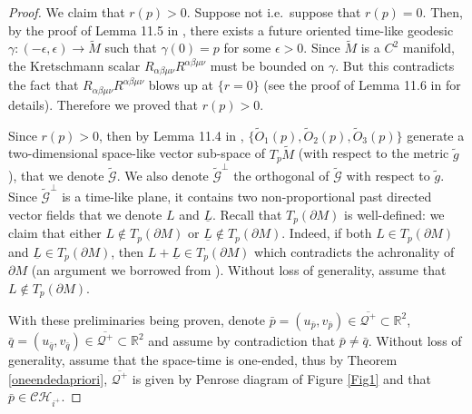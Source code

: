 \documentclass[10pt,a4paper]{article}
\newcommand{\barL}{\underline{L}}
\theoremstyle{plain}
\theoremstyle{remark}
\newcommand{\Oo}{\tilde{O}_1}
\newcommand{\Ot}{\tilde{O}_2}
\newcommand{\Oth}{\tilde{O}_3}
\theoremstyle{definition}
\newcommand{\RR}{\mathbb{R}}
\theoremstyle{plain}
\theoremstyle{remark}
\theoremstyle{definition}
\newcommand{\CH}{\mathcal{CH}_{i^+}}
\numberwithin{equation}{section}
\begin{document}
\begin{proof}
  We claim that $r(p)>0$. Suppose not i.e.\ suppose that $r(p)=0$. Then, by the proof of Lemma 11.5 in \cite{JonathanStab}, there exists a future oriented time-like geodesic $\gamma:(-\epsilon,\epsilon) \rightarrow \tilde{M}$ such that $\gamma(0)=p$ for some $\epsilon>0$. Since $\tilde{M}$ is a $C^2$ manifold, the Kretschmann scalar $R_{\alpha \beta \mu \nu}R^{\alpha \beta \mu \nu}$ must be bounded on $\gamma$. But this contradicts the fact that  $R_{\alpha \beta \mu \nu}R^{\alpha \beta \mu \nu}$ blows up at $\{r=0\}$ (see the proof of Lemma 11.6 in \cite{JonathanStab} for details). Therefore we proved that $r(p)>0$.
  
  Since $r(p)>0$, then by Lemma 11.4 in \cite{JonathanStab}, $\{ \Oo(p), \Ot(p), \Oth(p)\}$ generate a two-dimensional space-like vector sub-space of $T_p \tilde{M}$ (with respect to the metric $\tilde{g}$), that we denote $\tilde{\mathcal{G}}$. We also denote $\tilde{\mathcal{G}}^{\perp}$ the orthogonal of $\tilde{\mathcal{G}}$ with respect to $\tilde{g}$. Since $\tilde{\mathcal{G}}^{\perp}$ is a time-like plane, it contains two non-proportional past directed vector fields that we denote $L$ and $\barL$. Recall that $T_p(\partial M)$ is well-defined: we claim that either $L \notin T_p(\partial M)$ or  $\barL \notin T_p(\partial M)$. Indeed, if both $L \in T_p(\partial M)$ and  $\barL \in T_p(\partial M)$, then $L+\barL \in T_p(\partial M)$ which contradicts the achronality of $\partial M$ (an argument we borrowed from \cite{JonathanStab}). Without loss of generality, assume that $L \notin T_p(\partial M)$.
  
  
  With these preliminaries being proven, denote $\bar{p}=(u_{\bar{p}},v_{\bar{p}}) \in \overline{\mathcal{Q}^+} \subset \RR^{2}$, $\bar{q}=(u_{\bar{q}},v_{\bar{q}}) \in  \overline{\mathcal{Q}^+}\subset \RR^{2}$ and assume by contradiction that $\bar{p} \neq \bar{q}$. Without loss of generality, assume that the space-time is one-ended, thus by Theorem \ref{oneendedapriori},  $\overline{\mathcal{Q}^+}$ is given by Penrose diagram of Figure \ref{Fig1} and that $\bar{p} \in \CH$.
  

\end{proof}
\end{document}
